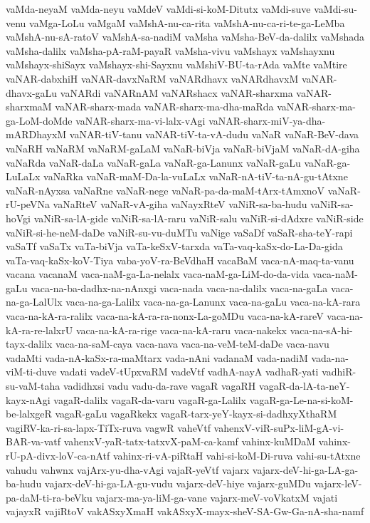{vaMda-neyaM
vaMda-neyu
vaMdeV
vaMdi-si-koM-Ditutx
vaMdi-suve
vaMdi-su-venu
vaMga-LoLu
vaMgaM
vaMshA-nu-ca-rita
vaMshA-nu-ca-ri-te-ga-LeMba
vaMshA-nu-sA-ratoV
vaMshA-sa-nadiM
vaMsha
vaMsha-BeV-da-dalilx
vaMshada
vaMsha-dalilx
vaMsha-pA-raM-payaR
vaMsha-vivu
vaMshayx
vaMshayxnu
vaMshayx-shiSayx
vaMshayx-shi-Sayxnu
vaMshiV-BU-ta-rAda
vaMte
vaMtire
vaNAR-dabxhiH
vaNAR-davxNaRM
vaNARdhavx
vaNARdhavxM
vaNAR-dhavx-gaLu
vaNARdi
vaNARnAM
vaNARshacx
vaNAR-sharxma
vaNAR-sharxmaM
vaNAR-sharx-mada
vaNAR-sharx-ma-dha-maRda
vaNAR-sharx-ma-ga-LoM-doMde
vaNAR-sharx-ma-vi-lalx-vAgi
vaNAR-sharx-miV-ya-dha-mARDhayxM
vaNAR-tiV-tanu
vaNAR-tiV-ta-vA-dudu
vaNaR
vaNaR-BeV-dava
vaNaRH
vaNaRM
vaNaRM-gaLaM
vaNaR-biVja
vaNaR-biVjaM
vaNaR-dA-giha
vaNaRda
vaNaR-daLa
vaNaR-gaLa
vaNaR-ga-Lanunx
vaNaR-gaLu
vaNaR-ga-LuLaLx
vaNaRka
vaNaR-maM-Da-la-vuLaLx
vaNaR-nA-tiV-ta-nA-gu-tAtxne
vaNaR-nAyxsa
vaNaRne
vaNaR-nege
vaNaR-pa-da-maM-tArx-tAmxnoV
vaNaR-rU-peVNa
vaNaRteV
vaNaR-vA-giha
vaNayxRteV
vaNiR-sa-ba-hudu
vaNiR-sa-hoVgi
vaNiR-sa-lA-gide
vaNiR-sa-lA-raru
vaNiR-salu
vaNiR-si-dAdxre
vaNiR-side
vaNiR-si-he-neM-daDe
vaNiR-su-vu-duMTu
vaNige
vaSaDf
vaSaR-sha-teY-rapi
vaSaTf
vaSaTx
vaTa-biVja
vaTa-keSxV-tarxda
vaTa-vaq-kaSx-do-La-Da-gida
vaTa-vaq-kaSx-koV-Tiya
vaba-yoV-ra-BeVdhaH
vacaBaM
vaca-nA-maq-ta-vanu
vacana
vacanaM
vaca-naM-ga-La-nelalx
vaca-naM-ga-LiM-do-da-vida
vaca-naM-gaLu
vaca-na-ba-dadhx-na-nAnxgi
vaca-nada
vaca-na-dalilx
vaca-na-gaLa
vaca-na-ga-LalUlx
vaca-na-ga-Lalilx
vaca-na-ga-Lanunx
vaca-na-gaLu
vaca-na-kA-rara
vaca-na-kA-ra-ralilx
vaca-na-kA-ra-ra-nonx-La-goMDu
vaca-na-kA-rareV
vaca-na-kA-ra-re-lalxrU
vaca-na-kA-ra-rige
vaca-na-kA-raru
vaca-nakekx
vaca-na-sA-hi-tayx-dalilx
vaca-na-saM-caya
vaca-nava
vaca-na-veM-teM-daDe
vaca-navu
vadaMti
vada-nA-kaSx-ra-maMtarx
vada-nAni
vadanaM
vada-nadiM
vada-na-viM-ti-duve
vadati
vadeV-tUpxvaRM
vadeVtf
vadhA-nayA
vadhaR-yati
vadhiR-su-vaM-taha
vadidhxsi
vadu
vadu-da-rave
vagaR
vagaRH
vagaR-da-lA-ta-neY-kayx-nAgi
vagaR-dalilx
vagaR-da-varu
vagaR-ga-Lalilx
vagaR-ga-Le-na-si-koM-be-lalxgeR
vagaR-gaLu
vagaRkekx
vagaR-tarx-yeY-kayx-si-dadhxyXthaRM
vagiRV-ka-ri-sa-lapx-TiTx-ruva
vagwR
vaheVtf
vahenxV-viR-suPx-liM-gA-vi-BAR-va-vatf
vahenxV-yaR-tatx-tatxvX-paM-ca-kamf
vahinx-kuMDaM
vahinx-rU-pA-divx-loV-ca-nAtf
vahinx-ri-vA-piRtaH
vahi-si-koM-Di-ruva
vahi-su-tAtxne
vahudu
vahwnx
vajArx-yu-dha-vAgi
vajaR-yeVtf
vajarx
vajarx-deV-hi-ga-LA-ga-ba-hudu
vajarx-deV-hi-ga-LA-gu-vudu
vajarx-deV-hiye
vajarx-guMDu
vajarx-leV-pa-daM-ti-ra-beVku
vajarx-ma-ya-liM-ga-vane
vajarx-meV-voVkatxM
vajati
vajayxR
vajiRtoV
vakASxyXmaH
vakASxyX-mayx-sheV-SA-Gw-Ga-nA-sha-namf
}
